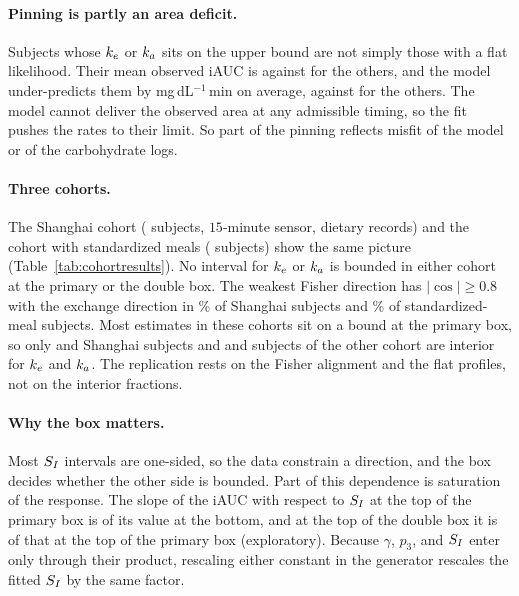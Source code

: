 \paragraph{Pinning is partly an area deficit.}
Subjects whose $k_e$ or $k_a$ sits on the upper bound are not simply those with a flat likelihood. Their mean observed
iAUC is \resBiasObsPinnedKe{} against \resBiasObsOtherKe{} for the others, and the model under-predicts them by
\resBiasSignedKe{} mg\,dL$^{-1}$\,min on average, against \resBiasSignedOtherKe{} for the others. The model cannot
deliver the observed area at any admissible timing, so the fit pushes the rates to their limit. So part of the pinning reflects misfit of the model or of the carbohydrate logs.

\paragraph{Three cohorts.}
The Shanghai cohort (\resRepShanghaiOneN{} subjects, $15$-minute sensor, dietary records) and the cohort with
standardized meals (\resRepHallOneN{} subjects) show the same picture (Table~\ref{tab:cohortresults}). No interval for $k_e$ or $k_a$ is bounded in either cohort at the primary or the double box.
The weakest Fisher direction has $|\cos|\ge0.8$ with the exchange direction in \resRepShanghaiOneCosine\% of Shanghai subjects and \resRepHallOneCosine\% of standardized-meal subjects. Most estimates in these cohorts sit on a bound at the
primary box, so only \resRepShanghaiOneInteriorKe{} and \resRepShanghaiOneInteriorKa{} Shanghai subjects and
\resRepHallOneInteriorKe{} and \resRepHallOneInteriorKa{} subjects of the other cohort are interior for $k_e$ and
$k_a$. The replication rests on the Fisher alignment and the flat profiles, not on the interior fractions.



\paragraph{Why the box matters.}
Most $S_I$ intervals are one-sided, so the data constrain a direction, and the box decides whether the other side is
bounded. Part of this dependence is saturation of the response. The slope of the iAUC with respect to $S_I$ at the top
of the primary box is \resSatTopToBottom{} of its value at the bottom, and at the top of the double box it is
\resSatDoubleTop{} of that at the top of the primary box (exploratory). Because $\gamma$, $p_3$, and $S_I$ enter only
through their product, rescaling either constant in the generator rescales the fitted $S_I$ by the same factor.

